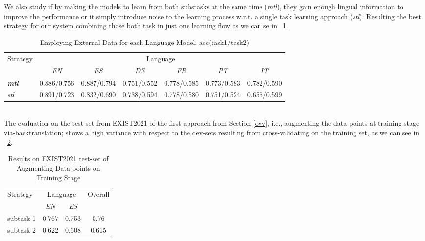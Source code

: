 \documentclass[
]{ceurart}
\begin{document}
	\\	 \\
	We also study if by making the models to learn from both substasks at the same time (\textit{mtl}), they gain enough lingual information to improve the performance or it simply introduce noise to the learning process w.r.t. a single task learning approach (\textit{stl}). Resulting the best strategy for our system combining those both task in just one learning flow as we can se in \tablename~\ref{multi-single}.
		\begin{table}[thb!]
		\begin{center} 		
			\caption{Employing External Data for each Language Model. acc(task1/task2)}	
			\begin{tabular}{lcccccc} 
				\hline	\multirow{2}{*}{Strategy}&\multicolumn{6}{c}{Language}\\
				\cline{2-7}
				&\textit{EN}&\textit{ES}&\textit{DE}&\textit{FR}&\textit{PT}&\textit{IT}\\
				\hline
					\textit{\textbf{mtl}} &0.886/0.756&0.887/0.794&0.751/0.552&0.778/0.585&0.773/0.583&0.782/0.590\\
			\textit{	stl}&0.891/0.723&0.832/0.690&0.738/0.594&0.778/0.580&0.751/0.524&0.656/0.599\\
				\hline
			\end{tabular}
			\label{multi-single}		
		\end{center}
	\end{table}		 		
		\\
 	The evaluation on the test set from EXIST2021 of the first approach from Section \ref{ovv}, i.e., augmenting the data-points at training stage via-backtranslation; shows a high variance with respect to the dev-sets resulting from cross-validating on the training set, as we can see in \tablename~\ref{points-augm}. 
		\begin{table}[thb!]
			\begin{center} 		
				\caption{Results on EXIST2021 test-set of Augmenting Data-points on Training Stage}	
				\begin{tabular}{lccc} 
					\hline	\multirow{2}{*}{Strategy}&\multicolumn{2}{c}{Language}&\multirow{2}{*}{Overall}\\
					\cline{2-3}
					&\textit{EN}&\textit{ES}&\\
					\hline
					subtask 1 &0.767&0.753&0.76\\
					subtask 2&0.622&0.608&0.615\\
					\hline
				\end{tabular}
				\label{points-augm}
			\end{center}
		\end{table}		 	
\end{document}

